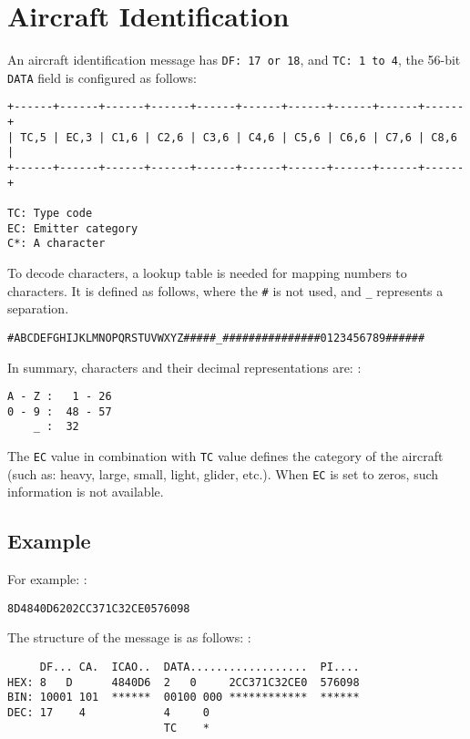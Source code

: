 \section{Aircraft Identification}\label{aircraft-identification}

An aircraft identification message has \texttt{DF:\ 17\ or\ 18}, and
\texttt{TC:\ 1\ to\ 4}, the 56-bit \texttt{DATA} field is configured as
follows:

\begin{verbatim}
+------+------+------+------+------+------+------+------+------+------+
| TC,5 | EC,3 | C1,6 | C2,6 | C3,6 | C4,6 | C5,6 | C6,6 | C7,6 | C8,6 |
+------+------+------+------+------+------+------+------+------+------+

TC: Type code
EC: Emitter category
C*: A character
\end{verbatim}

To decode characters, a lookup table is needed for mapping numbers to
characters. It is defined as follows, where the \texttt{\#} is not used,
and \texttt{\_} represents a separation.

\begin{verbatim}
#ABCDEFGHIJKLMNOPQRSTUVWXYZ#####_###############0123456789######
\end{verbatim}

In summary, characters and their decimal representations are: :

\begin{verbatim}
A - Z :   1 - 26
0 - 9 :  48 - 57
    _ :  32
\end{verbatim}

The \texttt{EC} value in combination with \texttt{TC} value defines the
category of the aircraft (such as: heavy, large, small, light, glider,
etc.). When \texttt{EC} is set to zeros, such information is not
available.

\subsection{Example}\label{example}

For example: :

\begin{verbatim}
8D4840D6202CC371C32CE0576098
\end{verbatim}

The structure of the message is as follows: :

\begin{verbatim}
     DF... CA.  ICAO..  DATA..................  PI....
HEX: 8   D      4840D6  2   0     2CC371C32CE0  576098
BIN: 10001 101  ******  00100 000 ************  ******
DEC: 17    4            4     0
                        TC    *
\end{verbatim}


